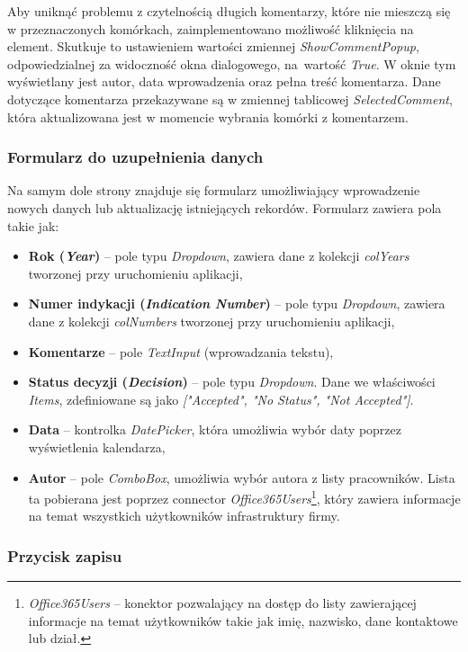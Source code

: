 Aby uniknąć problemu z czytelnością długich komentarzy, które nie mieszczą się w przeznaczonych komórkach, zaimplementowano możliwość kliknięcia na element. Skutkuje to ustawieniem wartości zmiennej \emph{ShowCommentPopup}, odpowiedzialnej za widoczność okna dialogowego, na~wartość \emph{True}. W oknie tym wyświetlany jest autor, data wprowadzenia oraz pełna treść komentarza. Dane dotyczące komentarza przekazywane są w zmiennej tablicowej \emph{SelectedComment}, która aktualizowana jest w momencie wybrania komórki z komentarzem.

\subsubsection*{Formularz do uzupełnienia danych}

Na samym dole strony znajduje się formularz umożliwiający wprowadzenie nowych danych lub aktualizację istniejących rekordów. Formularz zawiera pola takie jak:
\begin{itemize}
    \item \textbf{Rok (\emph{Year})} -- pole typu \emph{Dropdown}, zawiera dane z kolekcji \emph{colYears} tworzonej przy uruchomieniu aplikacji,
    \item \textbf{Numer indykacji (\emph{Indication Number})} -- pole typu \emph{Dropdown}, zawiera dane z kolekcji \emph{colNumbers} tworzonej przy uruchomieniu aplikacji,
    \item \textbf{Komentarze} -- pole \emph{TextInput} (wprowadzania tekstu),
    \item \textbf{Status decyzji (\emph{Decision})} -- pole typu \emph{Dropdown}. Dane we właściwości \emph{Items}, zdefiniowane są jako \emph{["Accepted", "No Status", "Not Accepted"]}.
    \item \textbf{Data} -- kontrolka \emph{DatePicker}, która umożliwia wybór daty poprzez wyświetlenia kalendarza,
    \item \textbf{Autor} -- pole \emph{ComboBox}, umożliwia wybór autora z listy pracowników. Lista ta pobierana jest poprzez connector \emph{Office365Users}\footnote{\emph{Office365Users} -- konektor pozwalający na dostęp do listy zawierającej informacje na temat użytkowników takie jak imię, nazwisko, dane kontaktowe lub dział.}, który zawiera informacje na temat wszystkich użytkowników infrastruktury firmy.
\end{itemize}


\subsubsection*{Przycisk zapisu}


